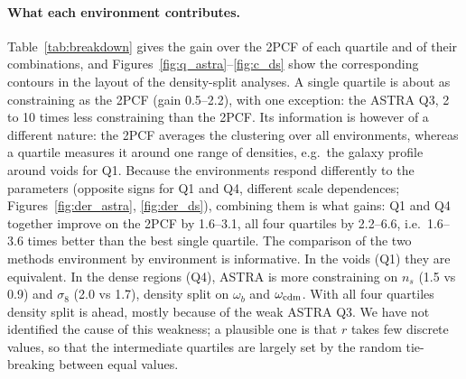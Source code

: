 \paragraph{What each environment contributes.} Table~\ref{tab:breakdown} gives the gain over the 2PCF of each quartile and of their combinations, and Figures~\ref{fig:q_astra}--\ref{fig:c_ds} show the corresponding contours in the layout of the density-split analyses. A single quartile is about as constraining as the 2PCF (gain 0.5--2.2), with one exception: the ASTRA Q3, 2 to 10 times less constraining than the 2PCF. Its information is however of a different nature: the 2PCF averages the clustering over all environments, whereas a quartile measures it around one range of densities, e.g.\ the galaxy profile around voids for Q1. Because the environments respond differently to the parameters (opposite signs for Q1 and Q4, different scale dependences; Figures~\ref{fig:der_astra}, \ref{fig:der_ds}), combining them is what gains: Q1 and Q4 together improve on the 2PCF by 1.6--3.1, all four quartiles by 2.2--6.6, i.e.\ 1.6--3.6 times better than the best single quartile. The comparison of the two methods environment by environment is informative. In the voids (Q1) they are equivalent. In the dense regions (Q4), ASTRA is more constraining on $n_s$ (1.5 vs 0.9) and $\sigma_8$ (2.0 vs 1.7), density split on $\omega_b$ and $\omega_{\rm cdm}$. With all four quartiles density split is ahead, mostly because of the weak ASTRA Q3. We have not identified the cause of this weakness; a plausible one is that $r$ takes few discrete values, so that the intermediate quartiles are largely set by the random tie-breaking between equal values.

